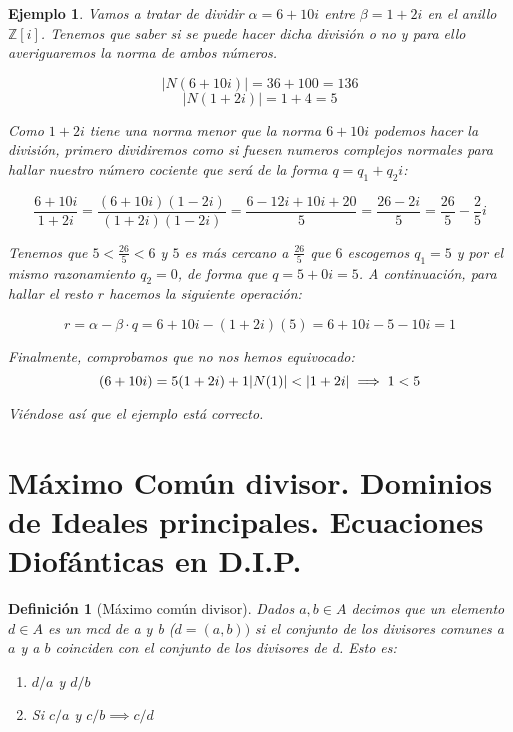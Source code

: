 \documentclass[11pt, a4paper, titlepage]{article}
\providecommand{\ent}{\mathbb{Z}}
\providecommand{\abs}[1]{\lvert#1\rvert}
\theoremstyle{theorem-style}
\theoremstyle{definition-style}
\newtheorem*{ndef}{Definición}
\theoremstyle{remark-style}
\theoremstyle{example-style}
\newtheorem*{ejemplo}{Ejemplo}
\newenvironment{nlist}
{\begin{enumerate}
\renewcommand\labelenumi{(\emph{\roman{enumi})}}}
{\end{enumerate}}
\begin{document}
\begin{ejemplo}
Vamos a tratar de dividir $\alpha=6+10i$ entre $\beta=1+2i$ en el anillo $\ent[i]$. Tenemos que saber si se puede hacer dicha división o no y para ello averiguaremos la norma de ambos números.

$$\abs{N(6+10i)}=36+100=136$$
$$\abs{N(1+2i)}=1+4=5$$

Como $1+2i$ tiene una norma menor que la norma $6+10i$ podemos hacer la división, primero dividiremos como si fuesen numeros complejos normales para hallar nuestro número cociente que será de la forma $q=q_1+q_2i$:

\[
	\frac{6+10i}{1+2i}=\frac{(6+10i)(1-2i)}{(1+2i)(1-2i)}=\frac{6-12i+10i+20}{5}=\frac{26-2i}{5}=\frac{26}{5}-\frac{2}{5}i
\]

Tenemos que $5<\frac{26}{5}<6$ y $5$ es más cercano a $\frac{26}{5}$ que $6$ escogemos $q_1=5$ y por el mismo razonamiento $q_2=0$, de forma que $q=5+0i=5$. A continuación, para hallar el resto $r$ hacemos la siguiente operación:

\[
	r=\alpha-\beta \cdot q = 6+10i - (1+2i)(5)=6+10i-5-10i=1
\]

Finalmente, comprobamos que no nos hemos equivocado:
\[
	(6+10i)=5(1+2i)+1\\
	\abs{N(1)}<\abs{1+2i} \implies 1<5
\]

Viéndose así que el ejemplo está correcto.

\end{ejemplo}

\section{Máximo Común divisor. Dominios de Ideales principales. Ecuaciones Diofánticas en D.I.P.}


\begin{ndef}[Máximo común divisor]

Dados $a,b \in A$ decimos que un elemento $d\in A$ es un mcd de a y b ($d=(a,b))$ si el conjunto de los divisores comunes a $a$ y a $b$ coinciden con el conjunto de los divisores de d. Esto es:

\begin{nlist}
	\item $d/a$ y $d/b$
	\item Si $c/a$ y $c/b \implies c/d$ 
\end{nlist} 
	
\end{ndef}
\end{document}
